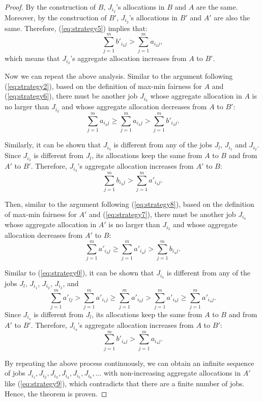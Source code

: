 \begin{proof}
By the construction of $B$, $J_{i_2}$'s allocations in $B$ and $A$ are the same. Moreover, by the construction of $B'$, $J_{i_2}$'s allocations in $B'$ and $A'$ are also the same. Therefore, (\ref{eq:strategy5}) implies that:
\begin{equation}
\sum_{j=1}^m b'_{i_2 j} > \sum_{j=1}^m a_{i_2 j},
\label{eq:strategy6}
\end{equation}
which means that $J_{i_2}$'s aggregate allocation increases from $A$ to $B'$. 

Now we can repeat the above analysis. Similar to the argument following (\ref{eq:strategy2}), based on the definition of max-min fairness for $A$ and (\ref{eq:strategy6}), there must be another job $J_{i_3}$ whose aggregate allocation in $A$ is no larger than $J_{i_2}$ and whose aggregate allocation decreases from $A$ to $B'$:
$$
\sum_{j=1}^m a_{i_2j} \geq \sum_{j=1}^m a_{i_3j} > \sum_{j=1}^m b'_{i_3j}.
$$

Similarly, it can be shown that $J_{i_3}$ is different from any of the jobs $J_l$, $J_{i_1}$ and $J_{i_2}$. Since $J_{i_3}$ is different from $J_l$, its allocations keep the same from $A$ to $B$ and from $A'$ to $B'$. Therefore, $J_{i_3}$'s aggregate allocation increases from $A'$ to $B$:
\begin{equation}
\sum_{j=1}^m b_{i_3j} > \sum_{j=1}^m a'_{i_3j}.
\label{eq:strategy7}
\end{equation}

Then, similar to the argument following (\ref{eq:strategy8}), 
based on the definition of max-min fairness for $A'$ and (\ref{eq:strategy7}), there must be another job $J_{i_4}$ whose aggregate allocation in $A'$ is no larger than $J_{i_3}$ and whose aggregate allocation decreases from $A'$ to $B$:
$$
\sum_{j=1}^m a'_{i_3j} \geq \sum_{j=1}^m a'_{i_4j} > \sum_{j=1}^m b_{i_4j}.
$$

Similar to (\ref{eq:strategy0}), it can be shown that $J_{i_4}$ is different from any of the jobs $J_l$, $J_{i_1}$, $J_{i_2}$, $J_{i_3}$, and 
\begin{equation}
\sum_{j=1}^m a'_{l j} > \sum_{j=1}^m a'_{i_1 j} \geq \sum_{j=1}^m a'_{i_2 j} > \sum_{j=1}^m a'_{i_3 j} \geq \sum_{j=1}^m a'_{i_4 j}.
\label{eq:strategy9}
\end{equation}
Since $J_{i_4}$ is different from $J_l$, its allocations keep the same from $A$ to $B$ and from $A'$ to $B'$. Therefore, $J_{i_4}$'s aggregate allocation increases from $A$ to $B'$:
$$
\sum_{j=1}^m b'_{i_4j} > \sum_{j=1}^m a_{i_4j}.
$$

By repeating the above process continuously, we can obtain an infinite sequence of jobs $J_{i_1}, J_{i_2}, J_{i_3}, J_{i_4}, J_{i_5}, J_{i_6}, \dots$ with non-increasing aggregate allocations in $A'$ like (\ref{eq:strategy9}), which contradicts that there are a finite number of jobs. Hence, the theorem is proven.
\end{proof}

